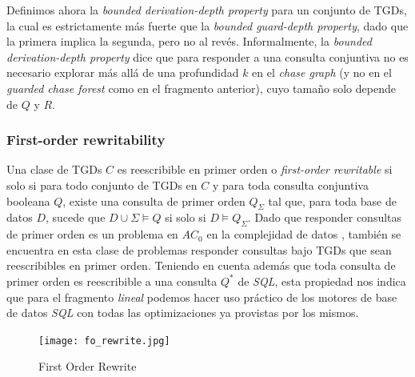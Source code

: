 \documentclass[11pt,a4paper,twoside]{tesis}
\begin{document}
Definimos ahora la \textit{bounded derivation-depth property} para un conjunto de TGDs, la cual es estrictamente más fuerte que la \textit{ bounded guard-depth property}, dado que la primera implica la segunda, pero no al revés. Informalmente, la \textit{bounded derivation-depth property} dice que para responder a una consulta conjuntiva no es necesario explorar más allá de una profundidad $k$ en el \textit{chase graph} (y no en el \textit{guarded chase forest} como en el fragmento anterior), cuyo tamaño solo depende de $Q$ y $R$.

\subsubsection{First-order rewritability}
Una clase de TGDs $C$ es reescribible en primer orden o \textit{first-order rewritable} si solo si para todo conjunto de TGDs en $C$ y para toda consulta conjuntiva booleana $Q$, existe una consulta de primer orden $Q_\Sigma$ tal que, para toda base de datos $D$, sucede que $D \cup \Sigma \models Q$ si solo si $D \models Q_\Sigma$. Dado que responder consultas de primer orden es un problema en $AC_0$ en la complejidad de datos \cite{Vardi}, también se encuentra en esta clase de problemas responder consultas bajo TGDs que sean reescribibles en primer orden. Teniendo en cuenta además que toda consulta de primer orden es reescribible a una consulta $Q^*$ de \textit{SQL}, esta propiedad nos indica que para el fragmento \textit{lineal} podemos hacer uso práctico de los motores de base de datos \textit{SQL} con todas las optimizaciones ya provistas por los mismos.

\begin{figure}[ht]
    \texttt{[image: fo\_rewrite.jpg]}
    \centering
    \caption{First Order Rewrite}
    \label{fig:fo_rewrite}
\end{figure}
\end{document}
